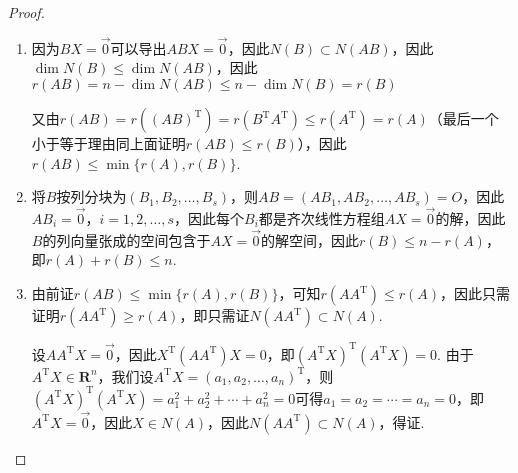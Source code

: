 \begin{proof}
    \begin{enumerate}
        \item 因为$BX=\vec{0}$可以导出$ABX=\vec{0}$，因此$N(B)\subset N(AB)$，因此$\dim N(B)\leqslant\dim N(AB)$，因此$r(AB)=n-\dim N(AB)\leqslant n-\dim N(B)=r(B)$

              又由$r(AB)=r((AB)^{\mathrm{T}})=r(B^{\mathrm{T}}A^{\mathrm{T}})\leqslant r(A^{\mathrm{T}})=r(A)$（最后一个小于等于理由同上面证明$r(AB)\leqslant r(B)$），因此$r(AB)\leqslant\min\{r(A),r(B)\}$.

        \item 将$B$按列分块为$(B_1,B_2,\ldots,B_s)$，则$AB=(AB_1,AB_2,\ldots,AB_s)=O$，因此$AB_i=\vec{0}$，$i=1,2,\ldots,s$，因此每个$B_i$都是齐次线性方程组$AX=\vec{0}$的解，因此$B$的列向量张成的空间包含于$AX=\vec{0}$的解空间，因此$r(B)\leqslant n-r(A)$，即$r(A)+r(B)\leqslant n$.

        \item 由前证$r(AB)\leqslant\min\{r(A),r(B)\}$，可知$r(AA^\mathrm{T})\leqslant r(A)$，因此只需证明$r(AA^\mathrm{T})\geqslant r(A)$，即只需证$N(AA^\mathrm{T})\subset N(A)$.

              设$AA^\mathrm{T}X=\vec{0}$，因此$X^\mathrm{T}(AA^\mathrm{T})X=0$，即$(A^\mathrm{T}X)^\mathrm{T}(A^\mathrm{T}X)=0$. 由于$A^\mathrm{T}X\in\mathbf{R}^n$，我们设$A^\mathrm{T}X=(a_1,a_2,\ldots,a_n)^\mathrm{T}$，则$(A^\mathrm{T}X)^\mathrm{T}(A^\mathrm{T}X)=a_1^2+a_2^2+\cdots+a_n^2=0$可得$a_1=a_2=\cdots=a_n=0$，即$A^\mathrm{T}X=\vec{0}$，因此$X \in N(A)$，因此$N(AA^\mathrm{T})\subset N(A)$，得证.


\end{enumerate}
\end{proof}
